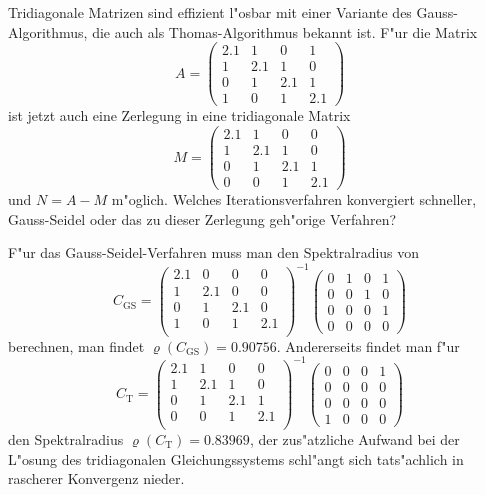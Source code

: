 Tridiagonale Matrizen sind effizient l"osbar mit einer Variante des
Gauss-Algorithmus, die auch als Thomas-Algorithmus bekannt ist.
F"ur die Matrix 
\[
A=\begin{pmatrix}
2.1&1&0&1\\
1&2.1&1&0\\
0&1&2.1&1\\
1&0&1&2.1
\end{pmatrix}
\]
ist jetzt auch eine Zerlegung in eine tridiagonale Matrix
\[
M=\begin{pmatrix}
2.1&1&0&0\\
1&2.1&1&0\\
0&1&2.1&1\\
0&0&1&2.1
\end{pmatrix}
\]
und $N=A-M$ m"oglich.
Welches Iterationsverfahren konvergiert schneller,
Gauss-Seidel oder das zu dieser Zerlegung geh"orige Verfahren?

\begin{loesung}
F"ur das Gauss-Seidel-Verfahren muss man den Spektralradius von
\[
C_{\text{GS}}=
\begin{pmatrix}
2.1&0&0&0\\
1&2.1&0&0\\
0&1&2.1&0\\
1&0&1&2.1\\
\end{pmatrix}^{-1}
\begin{pmatrix}
0&1&0&1\\
0&0&1&0\\
0&0&0&1\\
0&0&0&0
\end{pmatrix}
\]
berechnen, man findet $\varrho(C_{\text{GS}})=0.90756$.
Andererseits findet man f"ur 
\[
C_{\text{T}}=
\begin{pmatrix}
2.1&1&0&0\\
1&2.1&1&0\\
0&1&2.1&1\\
0&0&1&2.1\\
\end{pmatrix}^{-1}
\begin{pmatrix}
0&0&0&1\\
0&0&0&0\\
0&0&0&0\\
1&0&0&0
\end{pmatrix}
\]
den Spektralradius $\varrho(C_{\text{T}})=0.83969$,
der zus"atzliche Aufwand bei der L"osung
des tridiagonalen Gleichungssystems schl"angt sich tats"achlich in
rascherer Konvergenz nieder.
\end{loesung}
